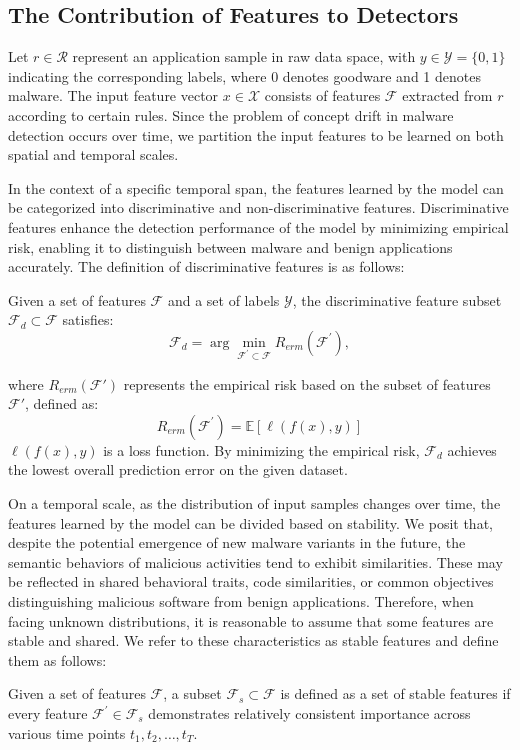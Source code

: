 \subsection{The Contribution of Features to Detectors}
 Let $r \in \mathcal{R}$ represent an application sample in raw data space, with $y \in \mathcal{Y} = \{0, 1\}$ indicating the corresponding labels, where 0 denotes goodware and 1 denotes malware. The input feature vector $x \in \mathcal{X}$ consists of features $\mathcal{F}$ extracted from $r$ according to certain rules. Since the problem of concept drift in malware detection occurs over time, we partition the input features to be learned on both spatial and temporal scales. 

 In the context of a specific temporal span, the features learned by the model can be categorized into discriminative and non-discriminative features. Discriminative features enhance the detection performance of the model by minimizing empirical risk, enabling it to distinguish between malware and benign applications accurately. The definition of discriminative features is as follows:

\begin{myDef}
\label{Discriminative}
Given a set of features $\mathcal{F}$ and a set of labels $\mathcal{Y}$, the discriminative feature subset $\mathcal{F}_d \subset \mathcal{F}$ satisfies:
\begin{equation}
\mathcal{F}_d=\arg \min _{\mathcal{F}^{\prime} \subset \mathcal{F}} R_{erm}\left(\mathcal{F}^{\prime}\right),
\end{equation}
\end{myDef}
where $R_{erm}(\mathcal{F}')$ represents the empirical risk based on the subset of features $\mathcal{F}'$, defined as:
\begin{equation}
R_{erm}\left(\mathcal{F}^{\prime}\right)=\mathbb{E}[\ell(f(x), y)]
\end{equation}
$\ell(f(x), y)$ is a loss function. By minimizing the empirical risk, $\mathcal{F}_d$ achieves the lowest overall prediction error on the given dataset.

On a temporal scale, as the distribution of input samples changes over time, the features learned by the model can be divided based on stability. We posit that, despite the potential emergence of new malware variants in the future, the semantic behaviors of malicious activities tend to exhibit similarities. These may be reflected in shared behavioral traits, code similarities, or common objectives distinguishing malicious software from benign applications. Therefore, when facing unknown distributions, it is reasonable to assume that some features are stable and shared. We refer to these characteristics as stable features and define them as follows:
\begin{myDef}
\label{Stable}
Given a set of features $\mathcal{F}$, a subset $\mathcal{F}_s \subset \mathcal{F}$ is defined as a set of stable features if every feature $\mathcal{F}^{\prime} \in \mathcal{F}_s$ demonstrates relatively consistent importance across various time points $t_1, t_2, \ldots, t_T$.
\end{myDef}

